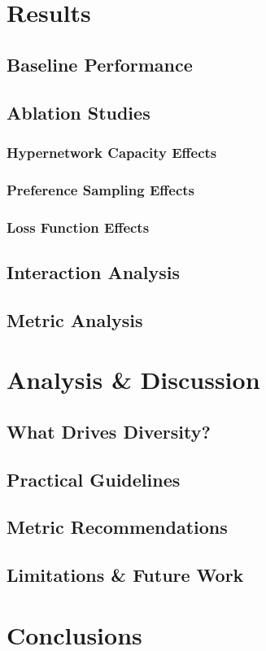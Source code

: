 \documentclass[10pts]{article}
\begin{document}
\section{Results}
\subsection{Baseline Performance}

\subsection{Ablation Studies}
\subsubsection{Hypernetwork Capacity Effects}

\subsubsection{Preference Sampling Effects}

\subsubsection{Loss Function Effects}

\subsection{Interaction Analysis}

\subsection{Metric Analysis}

\section{Analysis \& Discussion}
\subsection{What Drives Diversity?}

\subsection{Practical Guidelines}

\subsection{Metric Recommendations}

\subsection{Limitations \& Future Work}

\section{Conclusions}



\end{document}
